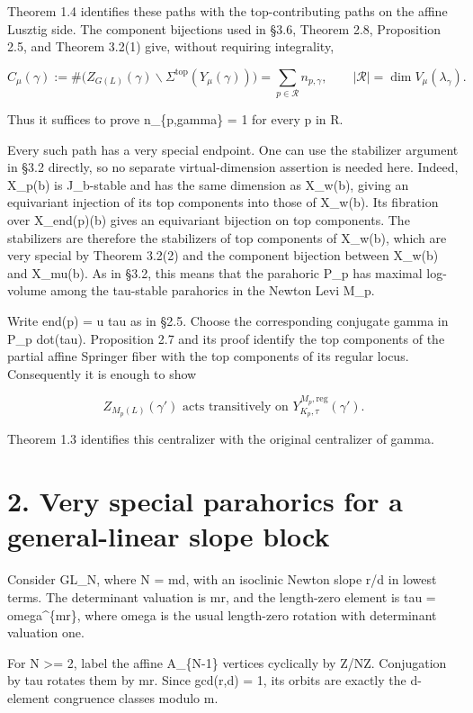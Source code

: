 \documentclass[11pt,a4paper]{article}
\begin{document}
Theorem 1.4 identifies these paths with the top-contributing paths on
the affine Lusztig side. The component bijections used in §3.6, Theorem
2.8, Proposition 2.5, and Theorem 3.2(1) give, without requiring
integrality,

\[
 C_\mu(\gamma)
 :=\#\bigl(Z_{G(L)}(\gamma)\backslash
 \Sigma^{\mathrm{top}}(Y_\mu(\gamma))\bigr)
 =\sum_{p\in\mathcal R}n_{p,\gamma},
 \qquad
 |\mathcal R|=\dim V_\mu(\lambda_\gamma).
\]

Thus it suffices to prove n\_\{p,gamma\} = 1 for every p in R.

Every such path has a very special endpoint. One can use the stabilizer
argument in §3.2 directly, so no separate virtual-dimension assertion is
needed here. Indeed, X\_p(b) is J\_b-stable and has the same dimension
as X\_w(b), giving an equivariant injection of its top components into
those of X\_w(b). Its fibration over X\_end(p)(b) gives an equivariant
bijection on top components. The stabilizers are therefore the
stabilizers of top components of X\_w(b), which are very special by
Theorem 3.2(2) and the component bijection between X\_w(b) and X\_mu(b).
As in §3.2, this means that the parahoric P\_p has maximal log-volume
among the tau-stable parahorics in the Newton Levi M\_p.

Write end(p) = u tau as in §2.5. Choose the corresponding conjugate
gamma\textquotesingle{} in P\_p dot(tau). Proposition 2.7 and its proof
identify the top components of the partial affine Springer fiber with
the top components of its regular locus. Consequently it is enough to
show

\[
 Z_{M_p(L)}(\gamma')
 \text{ acts transitively on }
 Y^{M_p,\mathrm{reg}}_{K_p,\tau}(\gamma').
 \tag{1}
\]

Theorem 1.3 identifies this centralizer with the original centralizer of
gamma.

\section{2. Very special parahorics for a general-linear slope
block}\label{very-special-parahorics-for-a-general-linear-slope-block}

Consider GL\_N, where N = md, with an isoclinic Newton slope r/d in
lowest terms. The determinant valuation is mr, and the length-zero
element is tau = omega\^{}\{mr\}, where omega is the usual length-zero
rotation with determinant valuation one.

For N \textgreater= 2, label the affine A\_\{N-1\} vertices cyclically
by Z/NZ. Conjugation by tau rotates them by mr. Since gcd(r,d) = 1, its
orbits are exactly the d-element congruence classes modulo m.
\end{document}
